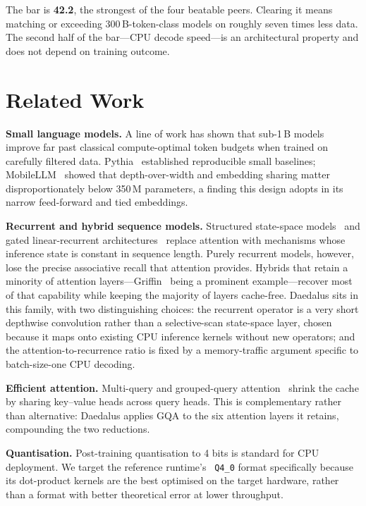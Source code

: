 \documentclass[conference]{IEEEtran}
\begin{document}
The bar is \textbf{42.2}, the strongest of the four beatable peers. Clearing it
means matching or exceeding 300\,B-token-class models on roughly seven times
less data. The second half of the bar---CPU decode speed---is an architectural
property and does not depend on training outcome.

\section{Related Work}

\textbf{Small language models.} A line of work has shown that sub-1\,B models
improve far past classical compute-optimal token budgets when trained on
carefully filtered data. Pythia~\cite{pythia} established reproducible small
baselines; MobileLLM~\cite{mobilellm} showed that depth-over-width and embedding
sharing matter disproportionately below 350\,M parameters, a finding this design
adopts in its narrow feed-forward and tied embeddings.

\textbf{Recurrent and hybrid sequence models.} Structured state-space
models~\cite{mamba} and gated linear-recurrent
architectures~\cite{rwkv} replace attention with mechanisms whose inference state
is constant in sequence length. Purely recurrent models, however, lose the
precise associative recall that attention provides. Hybrids that retain a
minority of attention layers---Griffin~\cite{griffin} being a prominent
example---recover most of that capability while keeping the majority of layers
cache-free. Daedalus sits in this family, with two distinguishing choices: the
recurrent operator is a very short depthwise convolution rather than a
selective-scan state-space layer, chosen because it maps onto existing CPU
inference kernels without new operators; and the attention-to-recurrence ratio
is fixed by a memory-traffic argument specific to batch-size-one CPU decoding.

\textbf{Efficient attention.} Multi-query and grouped-query
attention~\cite{gqa} shrink the cache by sharing key--value heads across query
heads. This is complementary rather than alternative: Daedalus applies GQA to
the six attention layers it retains, compounding the two reductions.

\textbf{Quantisation.} Post-training quantisation to 4 bits is standard for CPU
deployment. We target the reference runtime's~\cite{llamacpp} \texttt{Q4\_0}
format specifically because its dot-product kernels are the best optimised on
the target hardware, rather than a format with better theoretical
error at lower throughput.
\end{document}
